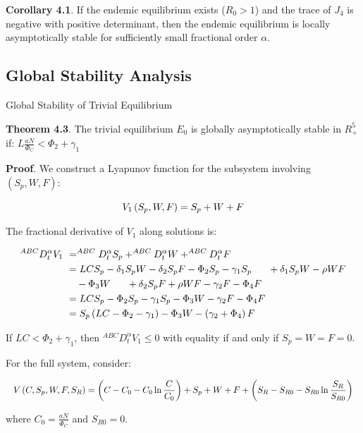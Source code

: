 \documentclass[10pt]{NSP1}
\newcommand{\fitwidth}[1]{\resizebox{\ifdim\width>\linewidth\linewidth\else\width\fi}{!}{#1}}
\begin{document}
\textbf{Corollary 4.1}. If the endemic equilibrium exists (\(R_{0} > 1\)) and the trace of \(J_{4}\) is negative with positive determinant, then the endemic equilibrium is locally asymptotically stable for sufficiently small fractional order \(\alpha\).

\subsection{Global Stability Analysis}

Global Stability of Trivial Equilibrium

\textbf{Theorem 4.3}. The trivial equilibrium \(E_{0}\) is globally asymptotically stable in \(R_{+}^{5}\) if: \(L\frac{aN}{\Phi_{C}} < \Phi_{2} + \gamma_{1}\)

\textbf{Proof}. We construct a Lyapunov function for the subsystem involving \(\left( S_{p},W,F \right)\):

\[
\fitwidth{$\displaystyle V_{1}\left( S_{p},W,F \right) = S_{p} + W + F$}
\]

The fractional derivative of \(V_{1}\) along solutions is:

\[
\fitwidth{$\displaystyle \begin{aligned}
^{ABC}D_{t}^{\alpha}V_{1}\ &= ^{ABC}D_{t}^{\alpha}S_{p} +^{ABC}D_{t}^{\alpha}W +^{ABC}D_{t}^{\alpha}F \\
\ &= LCS_{p} - \delta_{1}S_{p}W - \delta_{2}S_{p}F - \Phi_{2}S_{p} - \gamma_{1}S_{p}\ \ \quad + \delta_{1}S_{p}W - \rho WF \\
&\quad - \Phi_{3}W\ \ \quad + \delta_{2}S_{p}F + \rho WF - \gamma_{2}F - \Phi_{4}F \\
\ &= LCS_{p} - \Phi_{2}S_{p} - \gamma_{1}S_{p} - \Phi_{3}W - \gamma_{2}F - \Phi_{4}F \\
\ &= S_{p}\left( LC - \Phi_{2} - \gamma_{1} \right) - \Phi_{3}W - \left( \gamma_{2} + \Phi_{4} \right)F\
\end{aligned}$}
\]

If \(LC < \Phi_{2} + \gamma_{1}\), then \(^{ABC}D_{t}^{\alpha}V_{1} \leq 0\) with equality if and only if \(S_{p} = W = F = 0\).

For the full system, consider:

\[
\fitwidth{$\displaystyle V\left( C,S_{p},W,F,S_{R} \right) = \left( C - C_{0} - C_{0}\ln\frac{C}{C_{0}} \right) + S_{p} + W + F + \left( S_{R} - S_{R0} - S_{R0}\ln\frac{S_{R}}{S_{R0}} \right)$}
\]

where \(C_{0} = \frac{aN}{\Phi_{C}}\) and \(S_{R0} = 0\).
\end{document}
